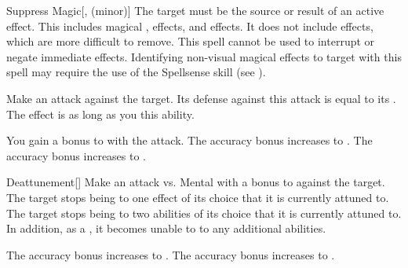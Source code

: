 \lowercase{\hypertarget{spell:Suppress Magic}{}}\label{spell:Suppress Magic}
\begin{freeability}[Rank 2]{\hypertarget{spell:Suppress Magic}{Suppress Magic}}[,  (minor)]
The target must be the source or result of an active  effect.
This includes magical ,  effects, and  effects.
It does not include  effects, which are more difficult to remove.
This spell cannot be used to interrupt or negate immediate effects.
Identifying non-visual magical effects to target with this spell may require the use of the Spellsense skill (see ).

Make an attack against the target.
Its defense against this attack is equal to its .
\hit The effect is  as long as you  this ability.

\rankline
{} You gain a  bonus to  with the attack.
 The accuracy bonus increases to .
 The accuracy bonus increases to .

\end{freeability}
\vspace{0.25em}



\lowercase{\hypertarget{spell:Deattunement}{}}\label{spell:Deattunement}
\begin{freeability}[Rank 3]{\hypertarget{spell:Deattunement}{Deattunement}}[]
Make an attack vs. Mental with a  bonus to  against the target.
\hit The target stops being  to one effect of its choice that it is currently attuned to.
\crit The target stops being  to two abilities of its choice that it is currently attuned to.
In addition, as a , it becomes unable to  to any additional abilities.

\rankline
{} The accuracy bonus increases to .
 The accuracy bonus increases to .

\end{freeability}
\vspace{0.25em}



